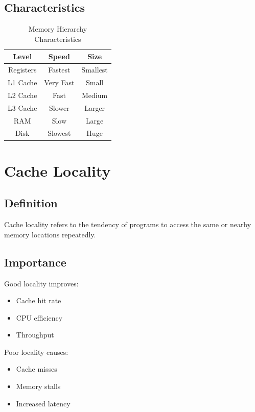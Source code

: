 \subsection{Characteristics}

\begin{table}[h]
\centering
\begin{tabular}{|c|c|c|}
\hline
Level & Speed & Size \\
\hline
Registers & Fastest & Smallest \\
L1 Cache & Very Fast & Small \\
L2 Cache & Fast & Medium \\
L3 Cache & Slower & Larger \\
RAM & Slow & Large \\
Disk & Slowest & Huge \\
\hline
\end{tabular}
\caption{Memory Hierarchy Characteristics}
\end{table}

\section{Cache Locality}

\subsection{Definition}

Cache locality refers to the tendency of programs to access the same or nearby memory locations repeatedly.

\subsection{Importance}

Good locality improves:

\begin{itemize}
\item Cache hit rate
\item CPU efficiency
\item Throughput
\end{itemize}

Poor locality causes:

\begin{itemize}
\item Cache misses
\item Memory stalls
\item Increased latency
\end{itemize}

